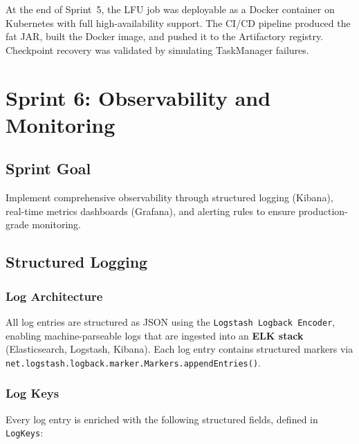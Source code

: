 At the end of Sprint~5, the LFU job was deployable as a Docker container on Kubernetes with full high-availability support. The CI/CD pipeline produced the fat JAR, built the Docker image, and pushed it to the Artifactory registry. Checkpoint recovery was validated by simulating TaskManager failures.

\section{Sprint 6: Observability and Monitoring}
\label{sec:sprint6}

\subsection{Sprint Goal}

Implement comprehensive observability through structured logging (Kibana), real-time metrics dashboards (Grafana), and alerting rules to ensure production-grade monitoring.

\subsection{Structured Logging}

\subsubsection{Log Architecture}

All log entries are structured as JSON using the \texttt{Logstash Logback Encoder}, enabling machine-parseable logs that are ingested into an \textbf{ELK stack} (Elasticsearch, Logstash, Kibana). Each log entry contains structured markers via \texttt{net.logstash.logback.marker.Markers.appendEntries()}.

\subsubsection{Log Keys}

Every log entry is enriched with the following structured fields, defined in \texttt{LogKeys}:

